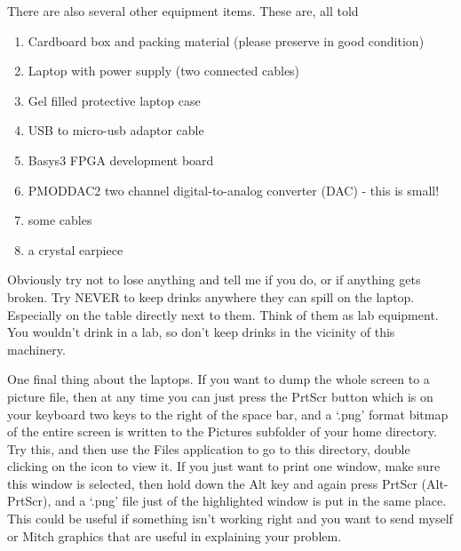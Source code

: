 \documentclass[../physical_computing.tex]{subfiles}
\begin{document}
There are also several other equipment items. These are, all told
\begin{enumerate}
    \item Cardboard box and packing material (please preserve in good condition)
    \item Laptop with power supply (two connected cables)
    \item Gel filled protective laptop case
    \item USB to micro-usb adaptor cable
    \item Basys3 FPGA development board
    \item PMODDAC2 two channel digital-to-analog converter (DAC) - this is small!
    \item some cables
    \item a crystal earpiece
\end{enumerate}

Obviously try not to lose anything and tell me if you do, or if anything gets broken. Try NEVER to keep drinks anywhere they can spill on the laptop. Especially on the table directly next to them. Think of them as lab equipment. You wouldn't drink in a lab, so don't keep drinks in the vicinity of this machinery.

One final thing about the laptops. If you want to dump the whole screen to a picture file, then at any time you can just press the PrtScr button which is on your keyboard two keys to the right of the space bar, and a `.png' format bitmap of the entire screen is written to the Pictures subfolder of your home directory. Try this, and then use the Files application to go to this directory, double clicking on the icon to view it. If you just want to print one window, make sure this window is selected, then hold down the Alt key and again press PrtScr (Alt-PrtScr), and a `.png' file just of the highlighted window is put in the same place. This could be useful if something isn't working right and you want to send myself or Mitch graphics that are useful in explaining your problem.
\end{document}
